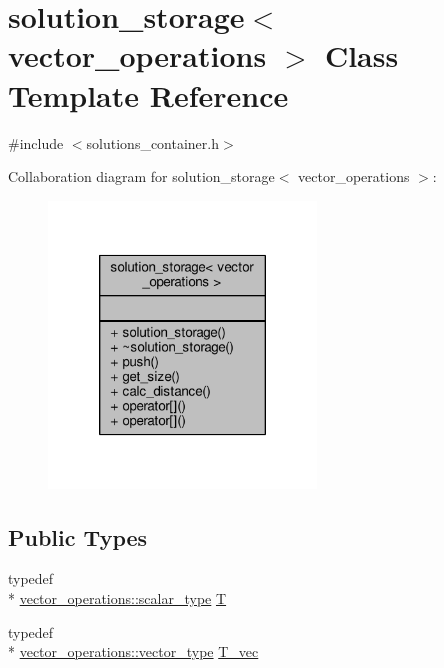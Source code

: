 \hypertarget{classsolution__storage}{\section{solution\-\_\-storage$<$ vector\-\_\-operations $>$ Class Template Reference}
\label{classsolution__storage}
}


{\ttfamily \#include $<$solutions\-\_\-container.\-h$>$}



Collaboration diagram for solution\-\_\-storage$<$ vector\-\_\-operations $>$\-:
\nopagebreak
\begin{figure}[H]
\begin{center}
\leavevmode
\includegraphics[width=202pt]{classsolution__storage__coll__graph}
\end{center}
\end{figure}
\subsection*{Public Types}
\begin{DoxyCompactItemize}
\item 
typedef \\*
\hyperlink{structcpu__vector__operations_aca6b216aa1fb172df83d98350e94fd61}{vector\-\_\-operations\-::scalar\-\_\-type} \hyperlink{classsolution__storage_a8de9429eee6a772dca6a68e230943428}{T}
\item 
typedef \\*
\hyperlink{structcpu__vector__operations_a1962836df596ce262704d208e9a6d8f9}{vector\-\_\-operations\-::vector\-\_\-type} \hyperlink{classsolution__storage_ae62caec157857515e58957a7e0f02cef}{T\-\_\-vec}
\end{DoxyCompactItemize}

